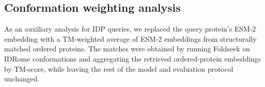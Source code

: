 \subsection{Conformation weighting analysis}

As an auxiliary analysis for IDP queries, we replaced the query protein's ESM-2 embedding with a TM-weighted average of ESM-2 embeddings from structurally matched ordered proteins. The matches were obtained by running Foldseek on IDRome conformations and aggregating the retrieved ordered-protein embeddings by TM-score, while leaving the rest of the model and evaluation protocol unchanged.
